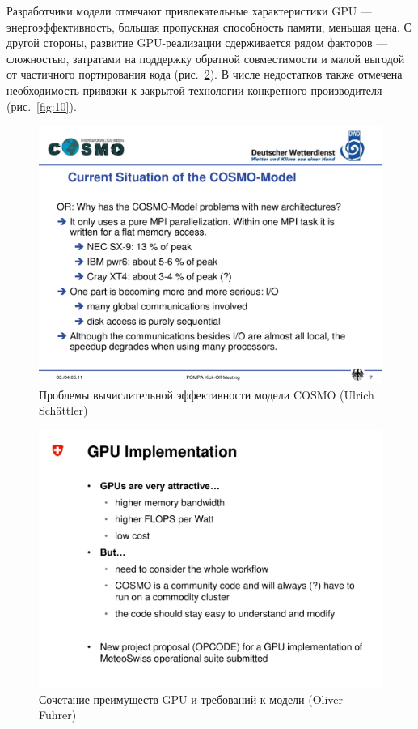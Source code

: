 \documentclass[a4,12pt]{report}
\begin{document}
Разработчики модели отмечают привлекательные характеристики GPU --- энергоэффективность, большая пропускная способность памяти, меньшая цена. С другой стороны, развитие GPU-реализации сдерживается рядом факторов --- сложностью, затратами на поддержку обратной совместимости и малой выгодой от частичного портирования кода (рис.~\ref{fig:02}). В числе недостатков также отмечена необходимость привязки к закрытой технологии конкретного производителя (рис.~\ref{fig:10}).

\begin{figure}
\centering
\includegraphics[scale=0.4]{slides/01.pdf}
\caption{Проблемы вычислительной эффективности модели COSMO (Ulrich Schättler)}
\label{fig:01}
\end{figure}

\begin{figure}
\centering
\includegraphics[scale=0.4]{slides/02.pdf}
\caption{Сочетание преимуществ GPU и требований к модели (Oliver Fuhrer)}
\label{fig:02}
\end{figure}
\end{document}
